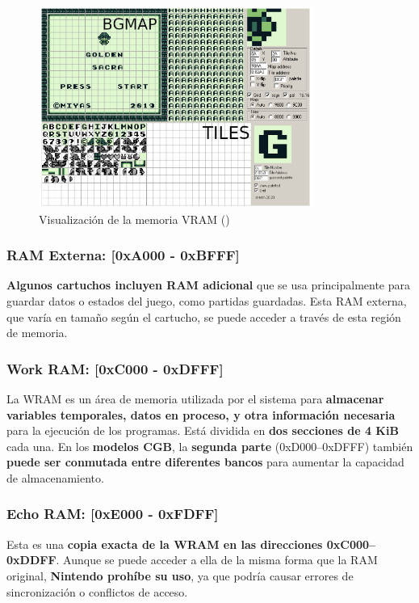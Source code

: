 \begin{figure}[H]
    \centering
    \includegraphics[width=0.8\textwidth]{include/images/mem_vram.png}
    \caption{Visualización de la memoria VRAM (\cite{goldensacra})}
    \label{figure:mem_vram}
\end{figure}

\subsubsection{RAM Externa: [0xA000 - 0xBFFF]}
\textbf{Algunos cartuchos incluyen RAM adicional} que se usa principalmente para guardar datos o estados del juego, como partidas guardadas. Esta RAM externa, que varía en tamaño según el cartucho, se puede acceder a través de esta región de memoria.

\clearpage

\subsubsection{Work RAM: [0xC000 - 0xDFFF]}
La WRAM es un área de memoria utilizada por el sistema para \textbf{almacenar variables temporales, datos en proceso, y otra información necesaria} para la ejecución de los programas. Está dividida en \textbf{dos secciones de 4 KiB} cada una. En los \textbf{modelos CGB}, la \textbf{segunda parte} (0xD000–0xDFFF) también \textbf{puede ser conmutada entre diferentes bancos} para aumentar la capacidad de almacenamiento.

\subsubsection{Echo RAM: [0xE000 - 0xFDFF]}
Esta es una \textbf{copia exacta de la WRAM en las direcciones 0xC000–0xDDFF}. Aunque se puede acceder a ella de la misma forma que la RAM original, \textbf{Nintendo prohíbe su uso}, ya que podría causar errores de sincronización o conflictos de acceso.


